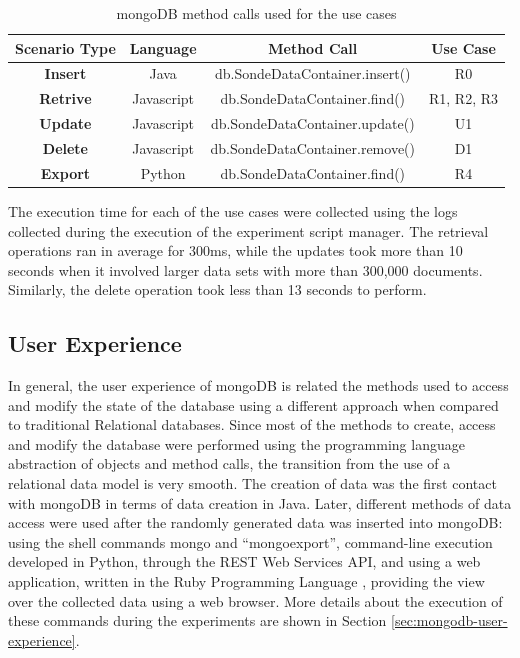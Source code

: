 \begin{table}[!h]
    \begin{center}
        \begin{tabular}{|c|c|c|c|}\hline
        \textbf{Scenario Type} & \textbf{Language} & \textbf{Method Call} & \textbf{Use Case}\\\hline 
        \textbf{Insert} & Java & db.SondeDataContainer.insert() & R0\\\hline
        \textbf{Retrive} & Javascript & db.SondeDataContainer.find() & R1, R2, R3\\\hline 
        \textbf{Update} & Javascript & db.SondeDataContainer.update() & U1\\\hline 
        \textbf{Delete} & Javascript & db.SondeDataContainer.remove() & D1\\\hline
        \textbf{Export} & Python & db.SondeDataContainer.find() & R4\\\hline
        \end{tabular}
        \caption{mongoDB method calls used for the use cases}
    \end{center}
    \label{tab:experiment-scenarios-mongo-methods}
\end{table}

The execution time for each of the use cases were collected using the logs
collected during the execution of the experiment script manager. The retrieval
operations ran in average for 300ms, while the updates took more than 10
seconds when it involved larger data sets with more than 300,000 documents.
Similarly, the delete operation took less than 13 seconds to perform.

\subsection{User Experience}
\label{sec:experiments-user-experimence}

In general, the user experience of mongoDB is related the methods used to
access and modify the state of the database using a different approach when
compared to traditional Relational databases. Since most of the methods to
create, access and modify the database were performed using the programming
language abstraction of objects and method calls, the transition from the use
of a relational data model is very smooth. The creation of data was the first
contact with mongoDB in terms of data creation in Java. Later, different
methods of data access were used after the randomly generated data was
inserted into mongoDB: using the shell commands mongo and ``mongoexport'',
command-line execution developed in Python, through the REST Web Services API,
and using a web application, written in the Ruby Programming Language
\cite{ruby}, providing the view over the collected data using a web browser.
More details about the execution of these commands during the experiments are
shown in Section \ref{sec:mongodb-user-experience}.

